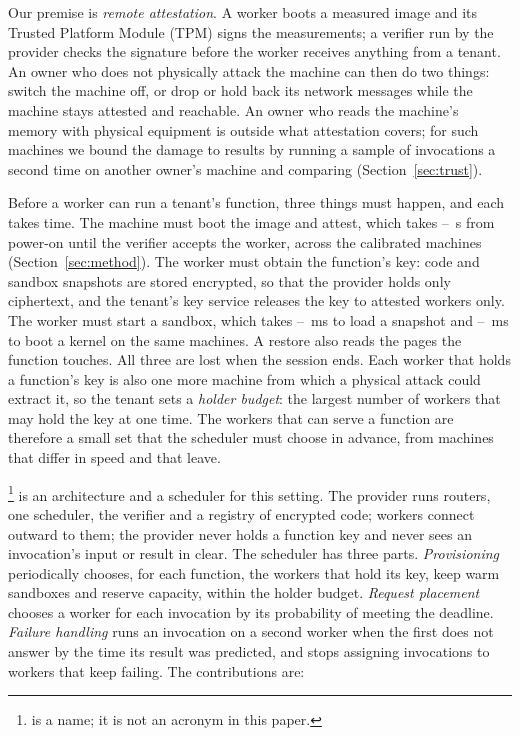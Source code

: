 Our premise is \emph{remote attestation}. A worker boots a measured image and its Trusted Platform Module (TPM) signs
the measurements; a verifier run by the provider checks the signature before the worker receives anything from a
tenant. An owner who does not physically attack the machine can then do two things: switch the machine off, or drop
or hold back its network messages while the machine stays attested and reachable. An owner who reads the machine's
memory with physical equipment is outside what attestation covers; for such machines we bound the damage to results by
running a sample of invocations a second time on another owner's machine and comparing
(Section~\ref{sec:trust}).

Before a worker can run a tenant's function, three things must happen, and each takes time. The machine must boot the
image and attest, which takes \VMachPowerOnLo--\VMachPowerOnHi{}~s from power-on until the verifier accepts the worker,
across the calibrated machines (Section~\ref{sec:method}). The worker must obtain the function's key: code and sandbox
snapshots are stored encrypted, so that the provider holds only ciphertext, and the tenant's key service releases the
key to attested workers only. The worker must start a sandbox, which takes \VMachRestoreLo--\VMachRestoreHi{}~ms to
load a snapshot and \VMachBootLo--\VMachBootHi{}~ms to boot a kernel on the same machines. A restore also reads the
pages the function touches. All three are lost when the session ends. Each worker that holds a function's key is also
one more machine from which a physical attack could extract it, so the tenant sets a \emph{holder budget}: the largest
number of workers that may hold the key at one time. The workers that can serve a function are therefore a small set
that the scheduler must choose in advance, from machines that differ in speed and that leave.

\voss{}\footnote{\voss{} is a name; it is not an acronym in this paper.} is an architecture and a scheduler for this
setting. The provider runs routers, one scheduler, the verifier and a registry of encrypted code; workers connect
outward to them; the provider never holds a function key and never sees an invocation's input or result in clear.
The scheduler has three parts. \emph{Provisioning} periodically chooses, for each function, the workers that hold its
key, keep warm sandboxes and reserve capacity, within the holder budget. \emph{Request placement} chooses a worker for
each invocation by its probability of meeting the deadline. \emph{Failure handling} runs an invocation on a second
worker when the first does not answer by the time its result was predicted, and stops assigning invocations to
workers that keep failing. The contributions are:

